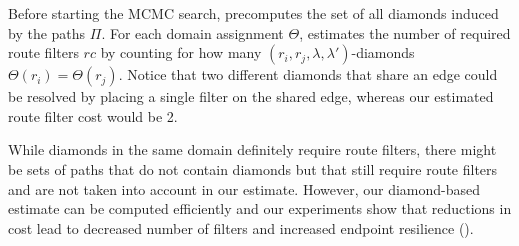 Before  starting the MCMC search, \name precomputes
the set of all diamonds induced by the paths $\Pi$. 
For each
domain assignment $\Theta$,
\name estimates the number of required 
route filters $rc$ by counting for 
how many $(r_i, r_j, \lambda, \lambda')$-diamonds
$\Theta(r_i) = \Theta(r_j)$. 
Notice that two different diamonds that share an edge could be resolved
by placing a single filter on the shared edge, whereas our estimated route filter cost 
would be 2. 

While diamonds in the same domain definitely require route filters, there might be
sets of paths that do not contain diamonds but that still require route filters
and are not
taken into account in our estimate. 
However, our diamond-based estimate
can be computed efficiently and 
our experiments  show that reductions 
in cost lead to decreased number of filters
and increased endpoint resilience ().


